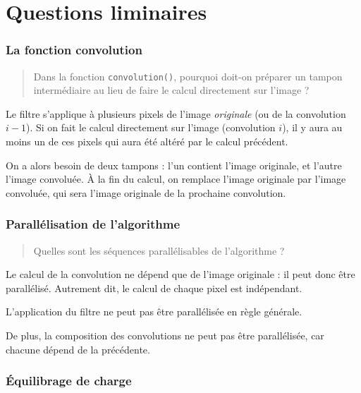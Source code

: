 
\section{Questions liminaires}

\subsubsection{La fonction convolution}

\begin{quotation}
  Dans la fonction \texttt{con\-vo\-lu\-tion(\-)}, pourquoi doit-on
  préparer un tampon intermédiaire au lieu de faire le calcul
  directement sur l'image ?
\end{quotation}

Le filtre s'applique à plusieurs pixels de l'image \emph{originale}
(ou de la convolution $i-1$). Si on fait le calcul directement sur
l'image (convolution $i$), il y aura au moins un de ces pixels qui
aura été altéré par le calcul précédent.

On a alors besoin de deux tampons : l'un contient l'image originale,
et l'autre l'image convoluée. À la fin du calcul, on remplace l'image
originale par l'image convoluée, qui sera l'image originale de la
prochaine convolution.


\subsubsection{Parallélisation de l'algorithme}

\begin{quotation}
  Quelles sont les séquences parallélisables de l'algorithme ?
\end{quotation}

Le calcul de la convolution ne dépend que de l'image originale : il
peut donc \^etre parallélisé. Autrement dit, le calcul de chaque pixel
est indépendant.

L'application du filtre ne peut pas \^etre parallélisée en règle
générale.

De plus, la composition des convolutions ne peut pas \^etre
parallélisée, car chacune dépend de la précédente.



\subsubsection{Équilibrage de charge}

